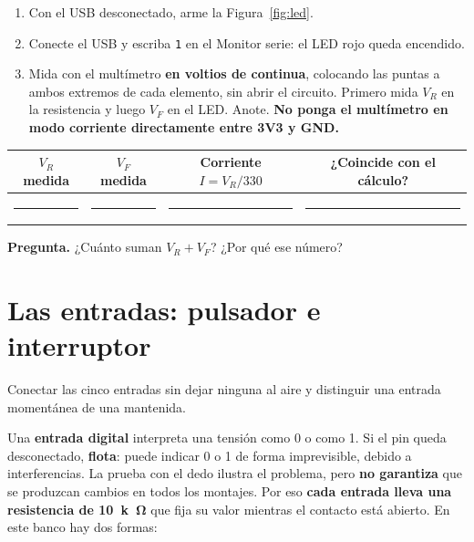 \documentclass[11pt,a4paper]{article}
\newcommand{\linea}[1][3cm]{\rule{#1}{0.4pt}}
\begin{document}
\begin{enumerate}
  \item Con el USB desconectado, arme la Figura~\ref{fig:led}.
  \item Conecte el USB y escriba \texttt{1} en el Monitor serie: el LED rojo queda encendido.
  \item Mida con el multímetro \textbf{en voltios de continua}, colocando las puntas a ambos extremos de cada elemento, sin abrir el circuito. Primero mida $V_R$ en la resistencia y luego $V_F$ en el LED. Anote. \textbf{No ponga el multímetro en modo corriente directamente entre 3V3 y GND.}
\end{enumerate}

\begin{center}\small\renewcommand{\arraystretch}{1.5}
\begin{tabular}{@{}c c c c@{}}
\toprule
$V_R$ medida & $V_F$ medida & Corriente $I = V_R/330$ & ¿Coincide con el cálculo?\\
\midrule
\linea[2cm] & \linea[2cm] & \linea[2.5cm] & \linea[3cm]\\
\bottomrule
\end{tabular}
\end{center}

\textbf{Pregunta.} ¿Cuánto suman $V_R + V_F$? ¿Por qué ese número?



\section{Las entradas: pulsador e interruptor}

\begin{objetivo}
Conectar las cinco entradas sin dejar ninguna al aire y distinguir una entrada momentánea de una mantenida.
\end{objetivo}

Una \textbf{entrada digital} interpreta una tensión como 0 o como 1. Si el pin queda desconectado, \textbf{flota}: puede indicar 0 o 1 de forma imprevisible, debido a interferencias. La prueba con el dedo ilustra el problema, pero \textbf{no garantiza} que se produzcan cambios en todos los montajes. Por eso \textbf{cada entrada lleva una resistencia de \SI{10}{k\ohm}} que fija su valor mientras el contacto está abierto. En este banco hay dos formas:
\end{document}
